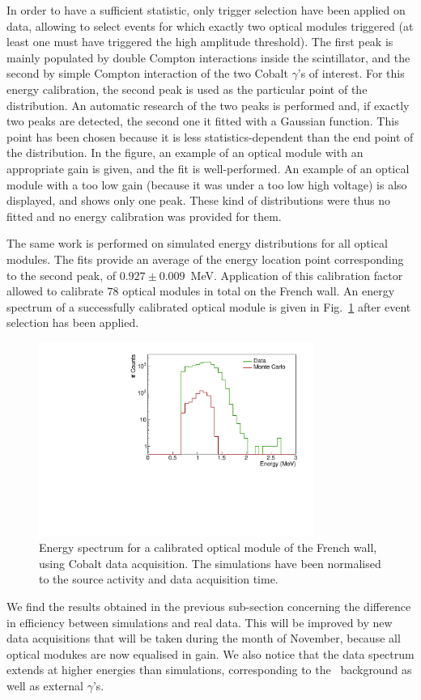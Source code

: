 In order to have a sufficient statistic, only trigger selection have been applied on data, allowing to select events for which exactly two optical modules triggered (at least one must have triggered the high amplitude threshold).
The first peak is mainly populated by double Compton interactions inside the scintillator, and the second by simple Compton interaction of the two Cobalt $\gamma$'s of interest.
For this energy calibration, the second peak is used as the particular point of the distribution.
An automatic research of the two peaks is performed and, if exactly two peaks are detected, the second one it fitted with a Gaussian function.
This point has been chosen because it is less statistics-dependent than the end point of the distribution.
In the figure, an example of an optical module with an appropriate gain is given, and the fit is well-performed.
An example of an optical module with a too low gain (because it was under a too low high voltage) is also displayed, and shows only one peak.
These kind of distributions were thus no fitted and no energy calibration was provided for them.

The same work is performed on simulated energy distributions for all optical modules.
The fits provide an average of the energy location point corresponding to the second peak, of $0.927\pm0.009$~MeV.
Application of this calibration factor allowed to calibrate $78$ optical modules in total on the French wall.
An energy spectrum of a successfully calibrated optical module is given in Fig.~\ref{fig:calib_energy_OM} after event selection has been applied.
\begin{figure}[h]
  \centering
  \includegraphics[width=0.8\textwidth]{CobaltStudy/fig_CobaltStudy/calib_energy_done.pdf}
  \caption{Energy spectrum for a calibrated optical module of the French wall, using Cobalt data acquisition.
    The simulations have been normalised to the source activity and data acquisition time.
    \label{fig:calib_energy_OM}}
\end{figure}
We find the results obtained in the previous sub-section concerning the difference in efficiency between simulations and real data.
This will be improved by new data acquisitions that will be taken during the month of November, because all optical modukes are now equalised in gain.
We also notice that the data spectrum extends at higher energies than simulations, corresponding to the \Tl\ background as well as external $\gamma$'s.

